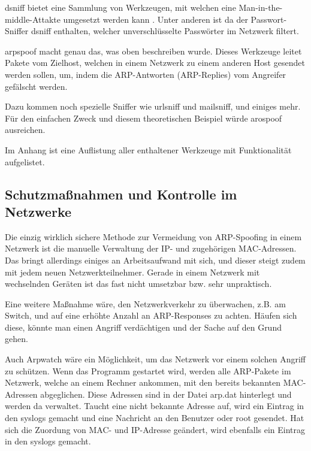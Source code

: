 dsniff bietet eine Sammlung von Werkzeugen, mit welchen eine Man-in-the-middle-Attakte umgesetzt werden kann \cite[vgl.]{dsniff_beschreibung}. Unter anderen ist da der Passwort-Sniffer dsniff enthalten, welcher unverschlüsselte Passwörter im Netzwerk filtert.

arpspoof macht genau das, was oben beschreiben wurde. Dieses Werkzeuge leitet Pakete vom Zielhost, welchen in einem Netzwerk zu einem anderen Host gesendet werden sollen, um, indem die ARP-Antworten (ARP-Replies) vom Angreifer gefälscht werden.\cite[vgl.]{arpspoof}

Dazu kommen noch spezielle Sniffer wie urlsniff und mailsniff, und einiges mehr.
Für den einfachen Zweck und diesem theoretischen Beispiel würde arospoof ausreichen.

Im Anhang ist eine Auflistung aller enthaltener Werkzeuge mit Funktionalität aufgelistet.


\subsection{Schutzmaßnahmen und Kontrolle im Netzwerke}
Die einzig wirklich sichere Methode zur Vermeidung von ARP-Spoofing in einem Netzwerk ist die manuelle Verwaltung der IP- und zugehörigen MAC-Adressen.
Das bringt allerdings einiges an Arbeitsaufwand mit sich, und dieser steigt zudem mit jedem neuen Netzwerkteilnehmer. Gerade in einem Netzwerk mit wechselnden Geräten ist das fast nicht umsetzbar bzw. sehr unpraktisch.

Eine weitere Maßnahme wäre, den Netzwerkverkehr zu überwachen, z.B. am Switch, und auf eine erhöhte Anzahl an ARP-Responses zu achten. Häufen sich diese, könnte man einen Angriff verdächtigen und der Sache auf den Grund gehen.

Auch Arpwatch\cite{arpwatch-download} wäre ein Möglichkeit, um das Netzwerk vor einem solchen Angriff zu schützen. Wenn das Programm gestartet wird, werden alle ARP-Pakete im Netzwerk, welche an einem Rechner ankommen, mit den bereits bekannten MAC-Adressen abgeglichen. Diese Adressen sind in der Datei arp.dat hinterlegt und werden da verwaltet. Taucht eine nicht bekannte Adresse auf, wird ein Eintrag in den syslogs gemacht und eine Nachricht an den Benutzer oder root gesendet. Hat sich die Zuordung von MAC- und IP-Adresse geändert, wird ebenfalls ein Eintrag in den syslogs gemacht. \cite[vgl.]{arpwatch}

